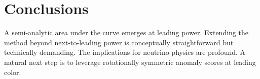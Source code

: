 \section{Conclusions}\label{sec:conclusions}

A semi-analytic area under the curve emerges at leading power. Extending
the method beyond next-to-leading power is conceptually straightforward
but technically demanding. The implications for neutrino physics are
profound. A natural next step is to leverage rotationally symmetric
anomaly scores at leading color.

